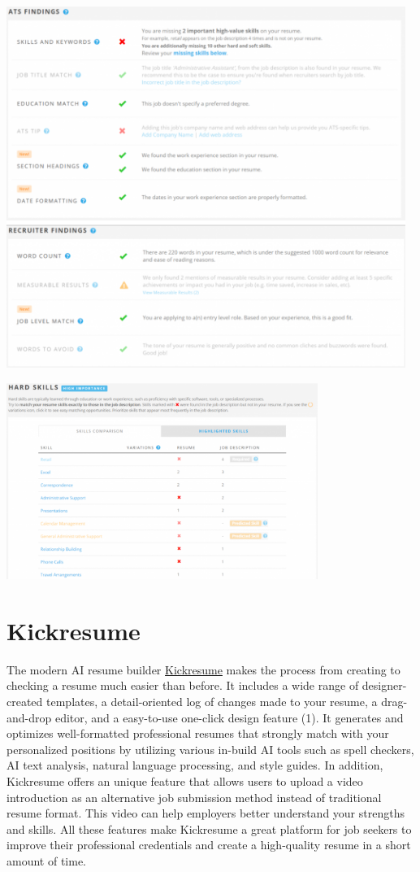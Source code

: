 \documentclass[
]{book}
\begin{document}
\includegraphics[width=5.11458in,height=\textheight]{Jobscan findings.png}

\includegraphics[width=3.98958in,height=\textheight]{Jobscan findings 2.png}

\hypertarget{kickresume}{%
\section{Kickresume}\label{kickresume}}

The modern AI resume builder \href{https://www.kickresume.com/en/}{Kickresume} makes the process from creating to checking a resume much easier than before. It includes a wide range of designer-created templates, a detail-oriented log of changes made to your resume, a drag-and-drop editor, and a easy-to-use one-click design feature (1). It generates and optimizes well-formatted professional resumes that strongly match with your personalized positions by utilizing various in-build AI tools such as spell checkers, AI text analysis, natural language processing, and style guides. In addition, Kickresume offers an unique feature that allows users to upload a video introduction as an alternative job submission method instead of traditional resume format. This video can help employers better understand your strengths and skills. All these features make Kickresume a great platform for job seekers to improve their professional credentials and create a high-quality resume in a short amount of time.
\end{document}
